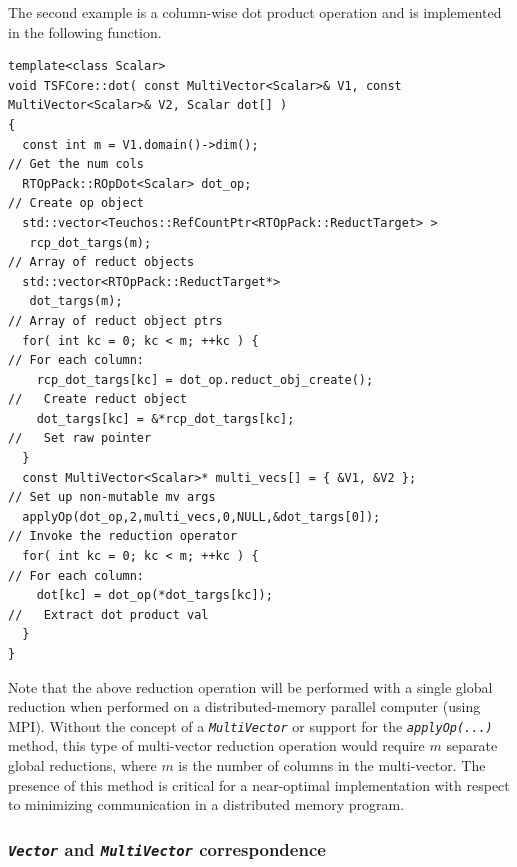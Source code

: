 The second example is a column-wise dot product operation and is
implemented in the following function.

{\scriptsize\begin{verbatim}
template<class Scalar>
void TSFCore::dot( const MultiVector<Scalar>& V1, const MultiVector<Scalar>& V2, Scalar dot[] )
{
  const int m = V1.domain()->dim();                                      // Get the num cols
  RTOpPack::ROpDot<Scalar> dot_op;                                       // Create op object
  std::vector<Teuchos::RefCountPtr<RTOpPack::ReductTarget> >
   rcp_dot_targs(m);                                                     // Array of reduct objects
  std::vector<RTOpPack::ReductTarget*>
   dot_targs(m);                                                         // Array of reduct object ptrs
  for( int kc = 0; kc < m; ++kc ) {                                      // For each column:
    rcp_dot_targs[kc] = dot_op.reduct_obj_create();                      //   Create reduct object
    dot_targs[kc] = &*rcp_dot_targs[kc];                                 //   Set raw pointer
  }
  const MultiVector<Scalar>* multi_vecs[] = { &V1, &V2 };                // Set up non-mutable mv args
  applyOp(dot_op,2,multi_vecs,0,NULL,&dot_targs[0]);                     // Invoke the reduction operator
  for( int kc = 0; kc < m; ++kc ) {                                      // For each column:
    dot[kc] = dot_op(*dot_targs[kc]);                                    //   Extract dot product val
  }
}
\end{verbatim}}

{}\noindent{}Note that the above reduction operation will be performed with a
single global reduction when performed on a distributed-memory
parallel computer (using MPI).  Without the concept of a
\texttt{\textit{Multi\-Vector}} or support for the
\texttt{\textit{applyOp(\-...)}} method, this type of multi-vector
reduction operation would require $m$ separate global reductions,
where $m$ is the number of columns in the multi-vector.  The
presence of this method is
critical for a near-optimal implementation with respect to
minimizing communication in a distributed memory program.

%
\subsubsection{\texttt{\textit{Vector}} and \texttt{\textit{Multi\-Vector}} correspondence}
\label{tsfcore:sec:vector_vs_multivector}
%

